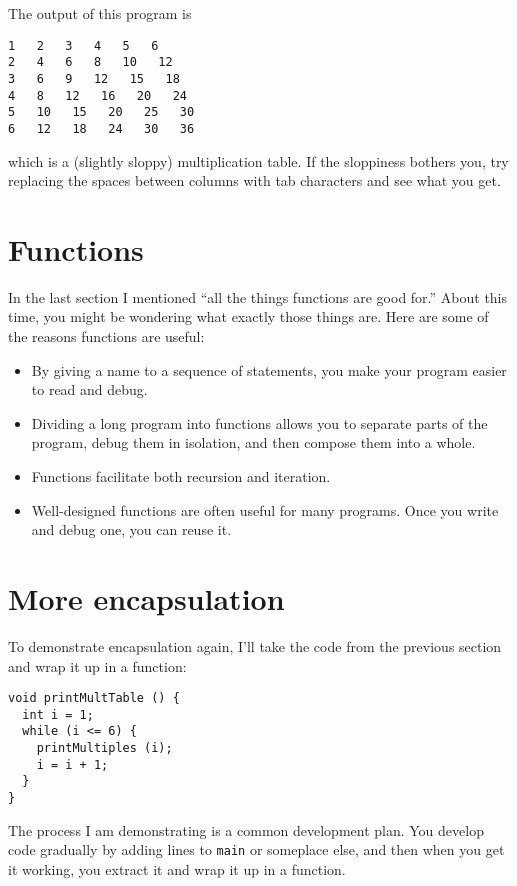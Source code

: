 The output of this program is

\begin{lstlisting}
1   2   3   4   5   6   
2   4   6   8   10   12   
3   6   9   12   15   18   
4   8   12   16   20   24   
5   10   15   20   25   30   
6   12   18   24   30   36   
\end{lstlisting}
%
which is a (slightly sloppy) multiplication table.  If the
sloppiness bothers you, try replacing the spaces between
columns with tab characters and see what you get.

\section{Functions}

In the last section I mentioned ``all the things functions
are good for.''  About this time, you might be wondering
what exactly those things are.  Here are some of the reasons
functions are useful:

\begin{itemize}

\item By giving a name to a sequence of statements, you make
your program easier to read and debug.

\item Dividing a long program into functions allows you to
separate parts of the program, debug them in isolation, and
then compose them into a whole.

\item Functions facilitate both recursion and iteration.

\item Well-designed functions are often useful for many programs.
Once you write and debug one, you can reuse it.

\end{itemize}

\section{More encapsulation}

To demonstrate encapsulation again, I'll take the code
from the previous section and wrap it up in a function:

\begin{lstlisting}
void printMultTable () {
  int i = 1;
  while (i <= 6) {
    printMultiples (i);
    i = i + 1;
  }
}
\end{lstlisting}
%
The process I am demonstrating is a common 
development plan.  You develop code gradually by adding
lines to {\tt main} or someplace else, and then when you get
it working, you extract it and wrap it up in a function.


